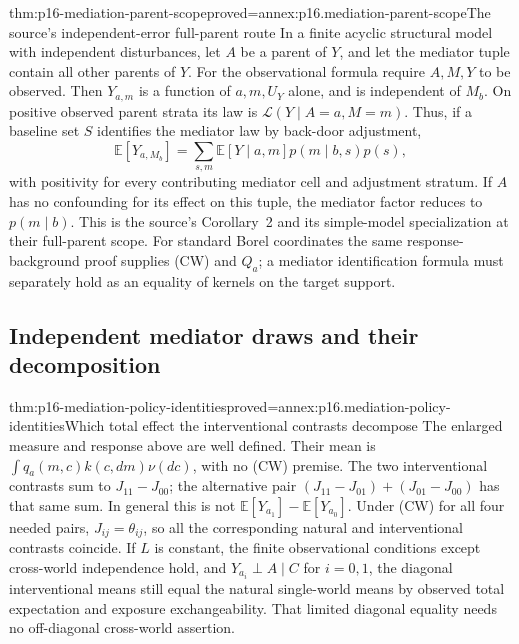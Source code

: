 \begin{hbtheorem}{thm:p16-mediation-parent-scope}{proved=annex:p16.mediation-parent-scope}{The source's independent-error full-parent route}
In a finite acyclic structural model with independent disturbances, let
\(A\) be a parent of \(Y\), and let the mediator tuple contain all
other parents of \(Y\).
For the observational formula require \(A,M,Y\) to be observed.
Then \(Y_{a,m}\) is a function of \(a,m,U_Y\) alone, and is independent
of \(M_b\). On positive observed parent strata its law is
\(\mathcal L(Y\mid A=a,M=m)\). Thus, if a baseline set \(S\) identifies
the mediator law by back-door adjustment,
\[
 \mathbb E[Y_{a,M_b}]
 =\sum_{s,m}\mathbb E[Y\mid a,m]p(m\mid b,s)p(s),
\]
with positivity for every contributing mediator cell and adjustment
stratum. If \(A\) has no confounding for its effect on this tuple, the
mediator factor reduces to \(p(m\mid b)\). This is the source's
Corollary~2 and its simple-model specialization at their full-parent scope.
For standard Borel coordinates the same response-background proof supplies
(CW) and \(Q_a\); a mediator identification formula must separately hold
as an equality of kernels on the target support.
\end{hbtheorem}

\subsection{Independent mediator draws and their decomposition}

\begin{hbtheorem}{thm:p16-mediation-policy-identities}{proved=annex:p16.mediation-policy-identities}{Which total effect the interventional contrasts decompose}
The enlarged measure and response above are well defined. Their mean is
\(\int q_a(m,c)k(c,dm)\nu(dc)\), with no (CW) premise. The two
interventional contrasts sum to \(J_{11}-J_{00}\); the alternative pair
\((J_{11}-J_{01})+(J_{01}-J_{00})\) has that same sum. In general this
is not \(\mathbb E[Y_{a_1}]-\mathbb E[Y_{a_0}]\).
Under (CW) for all four needed pairs, \(J_{ij}=\theta_{ij}\), so all the
corresponding natural and interventional contrasts coincide. If \(L\)
is constant, the finite observational conditions except cross-world
independence hold, and \(Y_{a_i}\perp A\mid C\) for \(i=0,1\),
the diagonal interventional means still equal the
natural single-world means by observed total expectation and exposure
exchangeability. That limited diagonal equality needs no off-diagonal
cross-world assertion.
\end{hbtheorem}

